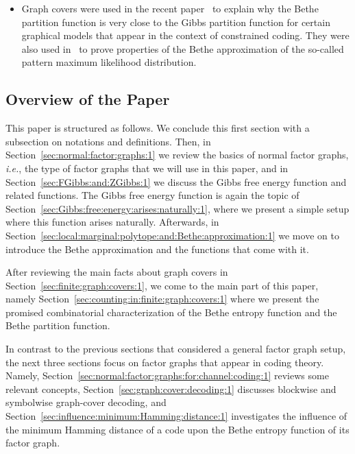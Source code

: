 \documentclass[journal, twocolumn]{IEEEtran}
\newcommand{\ie}{\emph{i.e.}}
\newcommand{\?}{\mathrm{?}}
\begin{document}
\begin{itemize}
\item Graph covers were used in the recent
  paper~\cite{Parvaresh:Vontobel:12:1} to explain why the Bethe partition
  function is very close to the Gibbs partition function for certain graphical
  models that appear in the context of constrained coding. They were also used
  in~\cite{Vontobel:12:1} to prove properties of the Bethe approximation of
  the so-called pattern maximum likelihood distribution.

\end{itemize}










 





\subsection{Overview of the Paper}


This paper is structured as follows. We conclude this first section with a
subsection on notations and definitions. Then, in
Section~\ref{sec:normal:factor:graphs:1} we review the basics of normal factor
graphs, \ie, the type of factor graphs that we will use in this paper, and in
Section~\ref{sec:FGibbs:and:ZGibbs:1} we discuss the Gibbs free energy
function and related functions. The Gibbs free energy function is again the
topic of Section~\ref{sec:Gibbs:free:energy:arises:naturally:1}, where we
present a simple setup where this function arises naturally. Afterwards, in
Section~\ref{sec:local:marginal:polytope:and:Bethe:approximation:1} we move on
to introduce the Bethe approximation and the functions that come with it.

After reviewing the main facts about graph covers in
Section~\ref{sec:finite:graph:covers:1}, we come to the main part of this
paper, namely Section~\ref{sec:counting:in:finite:graph:covers:1} where we
present the promised combinatorial characterization of the Bethe entropy
function and the Bethe partition function.

In contrast to the previous sections that considered a general factor graph
setup, the next three sections focus on factor graphs that appear in coding
theory. Namely, Section~\ref{sec:normal:factor:graphs:for:channel:coding:1}
reviews some relevant concepts, Section~\ref{sec:graph:cover:decoding:1}
discusses blockwise and symbolwise graph-cover decoding, and
Section~\ref{sec:influence:minimum:Hamming:distance:1} investigates the
influence of the minimum Hamming distance of a code upon the Bethe entropy
function of its factor graph.
\end{document}

